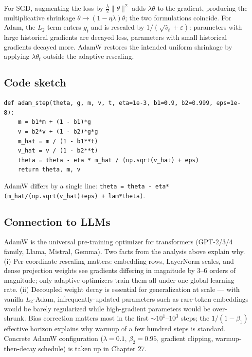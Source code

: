 \begin{proposition}
For SGD, augmenting the loss by $\tfrac{\lambda}{2}\|\theta\|^2$ adds $\lambda\theta$ to the gradient, producing the multiplicative shrinkage $\theta \mapsto (1-\eta\lambda)\theta$; the two formulations coincide. For Adam, the $L_2$ term enters $g_t$ and is rescaled by $1/(\sqrt{\hat v_t}+\varepsilon)$: parameters with large historical gradients are decayed less, parameters with small historical gradients decayed more. AdamW restores the intended uniform shrinkage by applying $\lambda\theta_t$ outside the adaptive rescaling.
\end{proposition}

\subsection*{Code sketch}

\begin{verbatim}
def adam_step(theta, g, m, v, t, eta=1e-3, b1=0.9, b2=0.999, eps=1e-8):
    m = b1*m + (1 - b1)*g
    v = b2*v + (1 - b2)*g*g
    m_hat = m / (1 - b1**t)
    v_hat = v / (1 - b2**t)
    theta = theta - eta * m_hat / (np.sqrt(v_hat) + eps)
    return theta, m, v
\end{verbatim}
AdamW differs by a single line: \texttt{theta = theta - eta*(m\_hat/(np.sqrt(v\_hat)+eps) + lam*theta)}.

\subsection*{Connection to LLMs}

AdamW is the universal pre-training optimizer for transformers (GPT-2/3/4 family, Llama, Mistral, Gemma). Two facts from the analysis above explain why. (i) Per-coordinate rescaling matters: embedding rows, LayerNorm scales, and dense projection weights see gradients differing in magnitude by 3--6 orders of magnitude; only adaptive optimizers train them all under one global learning rate. (ii) Decoupled weight decay is essential for generalization at scale --- with vanilla $L_2$-Adam, infrequently-updated parameters such as rare-token embeddings would be barely regularized while high-gradient parameters would be over-shrunk. Bias correction matters most in the first $\sim 10^1$--$10^3$ steps; the $1/(1-\beta_1)$ effective horizon explains why warmup of a few hundred steps is standard. Concrete AdamW configuration ($\lambda = 0.1$, $\beta_2 = 0.95$, gradient clipping, warmup-then-decay schedule) is taken up in Chapter 27.
